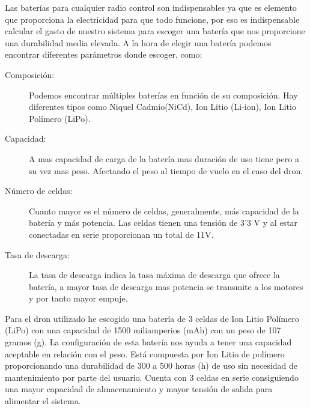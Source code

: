 
 Las baterías para cualquier radio control son indispensables ya que es elemento que proporciona la electricidad para que todo funcione, por eso es indispensable calcular el gasto de nuestro sistema para escoger una batería que nos proporcione una durabilidad media elevada.
 A la hora de elegir una batería podemos encontrar diferentes parámetros donde escoger, como:
 
 \begin{description}
 \item[Composición: ] Podemos encontrar múltiples baterías en función de su composición. Hay diferentes tipos como Niquel Cadmio(NiCd), Ion Litio (Li‑ion), Ion Litio Polímero (LiPo).
 \item[Capacidad: ] A mas capacidad de carga de la batería mas duración de uso tiene pero a su vez mas peso. Afectando el peso al tiempo de vuelo en el caso del dron.
 \item[Número de celdas: ] Cuanto mayor es el número de celdas, generalmente, más capacidad de la batería y más potencia. Las celdas tienen una tensión de 3'3 V y al estar conectadas en serie proporcionan un total de 11V.
 \item[Tasa de descarga: ] La tasa de descarga indica la tasa máxima de descarga que ofrece la batería, a mayor tasa de descarga mas potencia se transmite a los motores y por tanto mayor empuje. 
 \end{description}

Para el dron utilizado he escogido una batería de 3 celdas de Ion Litio Polímero (LiPo) con una capacidad de 1500 miliamperios (mAh) con un peso de 107 gramos (g). 
La configuración de esta batería nos ayuda a tener una capacidad aceptable en relación con el peso. 
Está compuesta por Ion Litio de polímero proporcionando una durabilidad de 300 a 500 horas (h) de uso sin necesidad de mantenimiento por parte del usuario. 
Cuenta con 3 celdas en serie consiguiendo una mayor capacidad de almacenamiento y mayor tensión de salida para alimentar el sistema.

